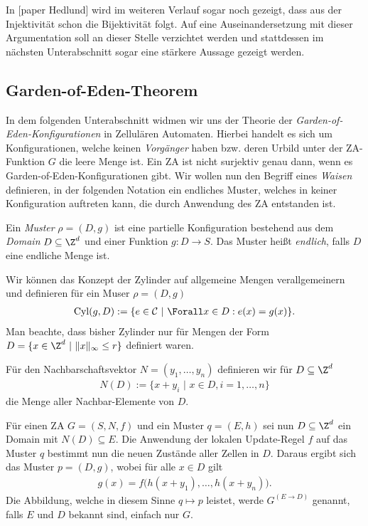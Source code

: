 In [paper Hedlund] wird im weiteren Verlauf sogar noch gezeigt, dass aus der Injektivität schon die Bijektivität folgt. Auf eine Auseinandersetzung mit dieser Argumentation soll an dieser Stelle verzichtet werden und stattdessen im nächsten Unterabschnitt sogar eine stärkere Aussage gezeigt werden.


\subsection{Garden-of-Eden-Theorem}
\label{subsection:gardenofeden}

In dem folgenden Unterabschnitt widmen wir uns der Theorie der \textit{Garden-of-Eden-Konfigurationen} in Zellulären Automaten. Hierbei handelt es sich um Konfigurationen, welche keinen \textit{Vorgänger} haben bzw. deren Urbild unter der ZA-Funktion $G$ die leere Menge ist. Ein ZA ist nicht surjektiv genau dann, wenn es Garden-of-Eden-Konfigurationen gibt. Wir wollen nun den Begriff eines \textit{Waisen} definieren, in der folgenden Notation ein endliches Muster, welches in keiner Konfiguration auftreten kann, die durch Anwendung des ZA entstanden ist.

\begin{definition}
  Ein \textit{Muster} $\rho = (D,g)$ ist eine partielle Konfiguration bestehend aus dem \textit{Domain} $D \subseteq \Z^d$ und einer Funktion $g: D \to S$. Das Muster heißt \textit{endlich}, falls $D$ eine endliche Menge ist.
\end{definition}

Wir können das Konzept der Zylinder auf allgemeine Mengen verallgemeinern und definieren für ein Muser $\rho = (D,g)$
\begin{align*}
  \text{Cyl}(g,D):= \{e \in \mathcal{C} \text{~}| \text{~} \Forall x \in D: e(x) = g(x) \}.
\end{align*}
Man beachte, dass bisher Zylinder nur für Mengen der Form $D = \{x \in \Z^d \text{~}| \text{~} \|x\|_\infty \leq r\}$ definiert waren.

Für den Nachbarschaftsvektor $N = (y_1, \dots, y_n)$ definieren wir für $D \subseteq \Z^d$
\begin{align*}
  N(D) := \{x + y_i \text{~} | \text{~} x \in D, i = 1, \dots , n\}
\end{align*}
die Menge aller Nachbar-Elemente von $D$.

Für einen ZA $G = (S,N,f)$ und ein Muster $q = (E,h)$ sei nun $D \subseteq \Z^d$ ein Domain mit $N(D) \subseteq E$. Die Anwendung der lokalen Update-Regel $f$ auf das Muster $q$ bestimmt nun die neuen Zustände aller Zellen in $D$. Daraus ergibt sich das Muster $p = (D,g)$, wobei für alle $x \in D$ gilt
\begin{align*}
  g(x) = f \big(h(x+y_1), \dots, h(x+y_n) \big).
\end{align*}
Die Abbildung, welche in diesem Sinne $q \mapsto p$ leistet, werde $G^{(E \to D)}$ genannt, falls $E$ und $D$ bekannt sind, einfach nur $G$.

